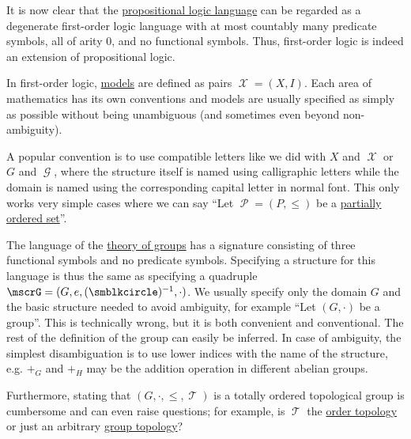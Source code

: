 \begin{remark}\label{rem:propositional_logic_as_first_order_logic}
  It is now clear that the \hyperref[subsec:propositional_logic]{propositional logic language} can be regarded as a degenerate first-order logic language with at most countably many predicate symbols, all of arity \( 0 \), and no functional symbols. Thus, first-order logic is indeed an extension of propositional logic.
\end{remark}

\begin{remark}\label{rem:first_order_model_notation}
  In first-order logic, \hyperref[def:first_order_semantics/satisfiability]{models} are defined as pairs \( \mscrX = (X, I) \). Each area of mathematics has its own conventions and models are usually specified as simply as possible without being unambiguous (and sometimes even beyond non-ambiguity).

  A popular convention is to use compatible letters like we did with \( X \) and \( \mscrX \) or \( G \) and \( \mscrG \), where the structure itself is named using calligraphic letters while the domain is named using the corresponding capital letter in normal font. This only works very simple cases where we can say \enquote{Let \( \mscrP = (P, \leq) \) be a \hyperref[def:partially_ordered_set]{partially ordered set}}.

  The language of the \hyperref[def:group/theory]{theory of groups} has a signature consisting of three functional symbols and no predicate symbols. Specifying a structure for this language is thus the same as specifying a quadruple \( \mscrG = (G, e, (\anon)^{-1}, \cdot) \). We usually specify only the domain \( G \) and the basic structure needed to avoid ambiguity, for example \enquote{Let \( (G, \cdot) \) be a group}. This is technically wrong, but it is both convenient and conventional. The rest of the definition of the group can easily be inferred. In case of ambiguity, the simplest disambiguation is to use lower indices with the name of the structure, e.g. \( +_G \) and \( +_H \) may be the addition operation in different abelian groups.

  Furthermore, stating that \( (G, \cdot, \leq, \mscrT) \) is a totally ordered topological group is cumbersome and can even raise questions; for example, is \( \mscrT \) the \hyperref[def:order_topology]{order topology} or just an arbitrary \hyperref[rem:topological_first_order_structures]{group topology}?
\end{remark}
